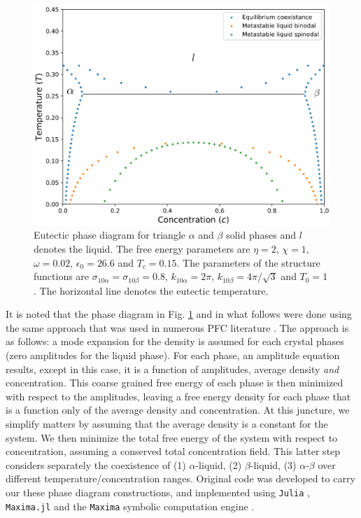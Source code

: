 \documentclass[showkeys, prb, reprint]{revtex4-1}
\begin{document}
\begin{figure}[h]
    \includegraphics[scale=0.45]{eutectic}
    \caption[Eutectic Phase Diagram]{
        \label{eutectic} Eutectic phase diagram for triangle $\alpha$ and
        $\beta$ solid phases and $l$ denotes the liquid. The free energy
        parameters are $\eta = 2$, $\chi = 1$, $\omega=0.02$, $\epsilon_0 =
        26.6$ and $T_c = 0.15$. The parameters of the structure functions are
        $\sigma_{10\alpha} = \sigma_{10\beta} = 0.8$, $k_{10\alpha} = 2\pi$,
        $k_{10\beta} = 4\pi/\sqrt{3}$ and $T_0 = 1$. The horizontal line
        denotes the eutectic temperature.
    }
\end{figure}

It is noted that the phase diagram in Fig. \ref{eutectic} and in what follows
were done using the same approach that was used in numerous PFC literature
\cite{GREENWOOD11_BINARY}. The approach is as follows: a mode expansion for the
density is assumed for each crystal phases (zero amplitudes for the liquid
phase). For each  phase, an amplitude equation results, except in this case, it
is a function of amplitudes, average density {\it and} concentration. This
coarse grained free energy of each phase is then minimized with respect to the
amplitudes, leaving a free energy density for each phase that is a function
only of the average density and concentration. At this juncture, we simplify
matters by assuming that the average density is a constant for the system. We
then minimize the total free energy of the system with respect to
concentration, assuming a conserved total concentration field. This latter step
considers separately the coexistence of  (1) $\alpha$-liquid, (2)
$\beta$-liquid, (3) $\alpha$-$\beta$ over different temperature/concentration
ranges. Original code was developed to carry our these phase diagram
constructions, and implemented using \texttt{Julia} \cite{JULIA},
\texttt{Maxima.jl} \cite{MAXIMAJL} and the \texttt{Maxima} symbolic computation
engine \cite{MAXIMA}.  
\end{document}
